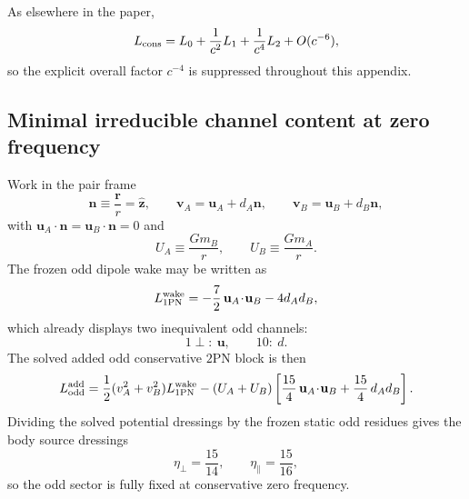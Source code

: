 \documentclass[11pt]{article}
\newcommand{\TwoPN}{\mathrm{2PN}}
\begin{document}
As elsewhere in the paper,
\begin{equation}
L_{\rm cons}=L_0+\frac{1}{c^2}L_1+\frac{1}{c^4}L_2+O(c^{-6}),
\label{eq:irred-dtn-pn-expansion}
\end{equation}
so the explicit overall factor \(c^{-4}\) is suppressed throughout this appendix.

\subsection{Minimal irreducible channel content at zero frequency}
\label{app:irred-dtn-static}

Work in the pair frame
\begin{equation}
\mathbf n\equiv \frac{\mathbf r}{r}=\hat{\mathbf z},
\qquad
\mathbf v_A=\mathbf u_A+d_A\mathbf n,
\qquad
\mathbf v_B=\mathbf u_B+d_B\mathbf n,
\label{eq:irred-dtn-pair-frame}
\end{equation}
with \(\mathbf u_A\!\cdot\!\mathbf n=\mathbf u_B\!\cdot\!\mathbf n=0\) and
\begin{equation}
U_A\equiv \frac{Gm_B}{r},
\qquad
U_B\equiv \frac{Gm_A}{r}.
\label{eq:irred-dtn-UAUB}
\end{equation}
The frozen odd dipole wake may be written as
\begin{equation}
L^{\rm wake}_{1\mathrm{PN}}
=-\frac72\,\mathbf u_A\!\cdot\!\mathbf u_B-4d_A d_B,
\label{eq:irred-dtn-1pn-odd}
\end{equation}
which already displays two inequivalent odd channels:
\begin{equation}
1\perp:\ \mathbf u,
\qquad
10:\ d.
\label{eq:irred-dtn-odd-channel-labels}
\end{equation}
The solved added odd conservative \(\TwoPN\) block is then
\begin{equation}
L^{\rm add}_{\rm odd}
=
\frac12(v_A^2+v_B^2)L^{\rm wake}_{1\mathrm{PN}}
-(U_A+U_B)
\left[
\frac{15}{4}\,\mathbf u_A\!\cdot\!\mathbf u_B
+\frac{15}{4}\,d_A d_B
\right].
\label{eq:irred-dtn-added-odd}
\end{equation}
Dividing the solved potential dressings by the frozen static odd residues gives the body
source dressings
\begin{equation}
\eta_{\perp}=\frac{15}{14},
\qquad
\eta_{\parallel}=\frac{15}{16},
\label{eq:irred-dtn-odd-eta}
\end{equation}
so the odd sector is fully fixed at conservative zero frequency.
\end{document}
